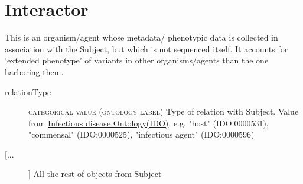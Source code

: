 \documentclass[a4paper, 10pt]{article}        %
\begin{document}
\begin{description}
 \end{description}
 


  
 \section*{{\color{teal} Interactor}}
This is an organism/agent whose metadata/ phenotypic data is collected in association with the Subject, but which is not sequenced itself. It accounts for 'extended phenotype' of variants in other organisms/agents than the one harboring them.
\begin{description}
	\item[relationType] {\textsc{categorical value (ontology label)}} Type of relation with Subject. Value from \href{https://www.ebi.ac.uk/ols/ontologies/ido}{Infectious disease Ontology(IDO)}, e.g. "host" (IDO:0000531), "commensal" (IDO:0000525), "infectious agent" (IDO:0000596)
	
	\item[[...]] All the rest of objects from Subject
\end{description}
 
 
\end{document}
